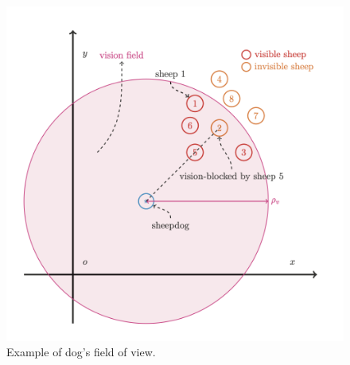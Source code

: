 \documentclass[9pt]{pnas-new}
\begin{document}

\begin{figure}[H]
	\centering
	\includegraphics[width=.5\linewidth]{fig/vision-field.png}
	\caption{Example of dog's field of view.\cite{liu2021}}
	\label{fig:vision-field}
\end{figure}
\end{document}
